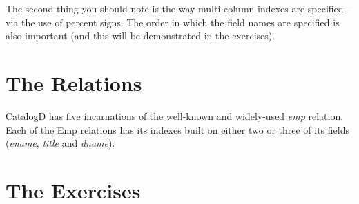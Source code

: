 The second thing you should note is the way multi-column indexes are
specified---via the use of percent signs.  The order in which the field
names are specified is also important (and this will be demonstrated in
the exercises).

\section{The Relations}

CatalogD has five incarnations of the well-known and widely-used {\em emp}
relation.  Each of the Emp relations has its indexes built on either two
or three of its fields ({\em ename}, {\em title} and {\em dname}).


\section{The Exercises}

